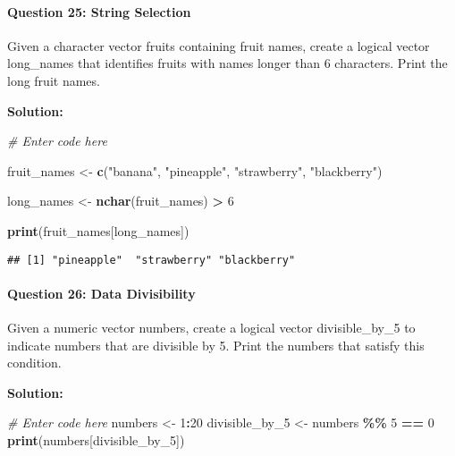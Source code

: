 \documentclass[
]{article}
\newenvironment{Shaded}{\begin{snugshade}}{\end{snugshade}}
\newcommand{\CommentTok}[1]{\textcolor[rgb]{0.56,0.35,0.01}{\textit{#1}}}
\newcommand{\DecValTok}[1]{\textcolor[rgb]{0.00,0.00,0.81}{#1}}
\newcommand{\FunctionTok}[1]{\textcolor[rgb]{0.13,0.29,0.53}{\textbf{#1}}}
\newcommand{\NormalTok}[1]{#1}
\newcommand{\OtherTok}[1]{\textcolor[rgb]{0.56,0.35,0.01}{#1}}
\newcommand{\SpecialCharTok}[1]{\textcolor[rgb]{0.81,0.36,0.00}{\textbf{#1}}}
\newcommand{\StringTok}[1]{\textcolor[rgb]{0.31,0.60,0.02}{#1}}
\begin{document}
\hypertarget{question-25-string-selection}{%
\paragraph{Question 25: String
Selection}\label{question-25-string-selection}}

Given a character vector fruits containing fruit names, create a logical
vector long\_names that identifies fruits with names longer than 6
characters. Print the long fruit names.

\textbf{Solution:}

\begin{Shaded}
\begin{Highlighting}[]
\CommentTok{\# Enter code here}

\NormalTok{fruit\_names }\OtherTok{\textless{}{-}} \FunctionTok{c}\NormalTok{(}\StringTok{"banana"}\NormalTok{, }\StringTok{"pineapple"}\NormalTok{, }\StringTok{"strawberry"}\NormalTok{, }\StringTok{"blackberry"}\NormalTok{)}

\NormalTok{long\_names }\OtherTok{\textless{}{-}} \FunctionTok{nchar}\NormalTok{(fruit\_names) }\SpecialCharTok{\textgreater{}} \DecValTok{6}

\FunctionTok{print}\NormalTok{(fruit\_names[long\_names])}
\end{Highlighting}
\end{Shaded}

\begin{verbatim}
## [1] "pineapple"  "strawberry" "blackberry"
\end{verbatim}

\hypertarget{question-26-data-divisibility}{%
\paragraph{Question 26: Data
Divisibility}\label{question-26-data-divisibility}}

Given a numeric vector numbers, create a logical vector divisible\_by\_5
to indicate numbers that are divisible by 5. Print the numbers that
satisfy this condition.

\textbf{Solution:}

\begin{Shaded}
\begin{Highlighting}[]
\CommentTok{\# Enter code here}
\NormalTok{numbers }\OtherTok{\textless{}{-}} \DecValTok{1}\SpecialCharTok{:}\DecValTok{20}
\NormalTok{divisible\_by\_5 }\OtherTok{\textless{}{-}}\NormalTok{ numbers }\SpecialCharTok{\%\%} \DecValTok{5} \SpecialCharTok{==} \DecValTok{0}
\FunctionTok{print}\NormalTok{(numbers[divisible\_by\_5])}
\end{Highlighting}
\end{Shaded}
\end{document}
